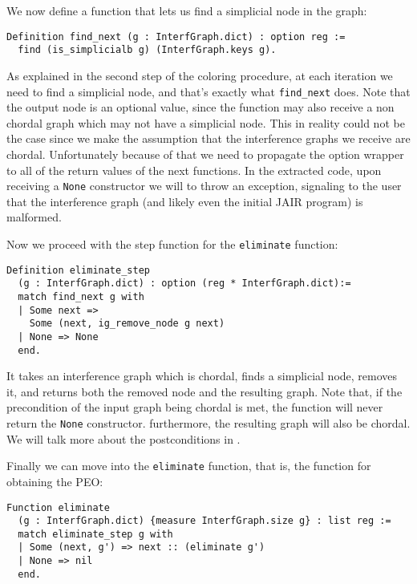 We now define a function that lets us find a simplicial node in the graph:

\begin{lstlisting}[style=Coq]
Definition find_next (g : InterfGraph.dict) : option reg :=
  find (is_simplicialb g) (InterfGraph.keys g).
\end{lstlisting}

As explained in the second step of the coloring procedure, at each iteration we need to find a simplicial node, and that's exactly what \texttt{find\_next} does. Note that the output node is an optional value, since the function may also receive a non chordal graph which may not have a simplicial node. This in reality could not be the case since we make the assumption that the interference graphs we receive are chordal. Unfortunately because of that we need to propagate the option wrapper to all of the return values of the next functions.
In the extracted code, upon receiving a \texttt{None} constructor we will to throw an exception, signaling to the user that the interference graph (and likely even the initial JAIR program) is malformed.

Now we proceed with the step function for the \texttt{eliminate} function:

\begin{lstlisting}[style=Coq]
Definition eliminate_step
  (g : InterfGraph.dict) : option (reg * InterfGraph.dict):=
  match find_next g with
  | Some next =>
    Some (next, ig_remove_node g next)
  | None => None
  end.
\end{lstlisting}

It takes an interference graph which is chordal, finds a simplicial node, removes it, and returns both the removed node and the resulting graph.
Note that, if the precondition of the input graph being chordal is met, the function will never return the \texttt{None} constructor. furthermore, the resulting graph will also be chordal.
We will talk more about the postconditions in .

Finally we can move into the \texttt{eliminate} function, that is, the function for obtaining the PEO:

\begin{lstlisting}[style=Coq]
Function eliminate
  (g : InterfGraph.dict) {measure InterfGraph.size g} : list reg :=
  match eliminate_step g with
  | Some (next, g') => next :: (eliminate g')
  | None => nil
  end.
\end{lstlisting}

